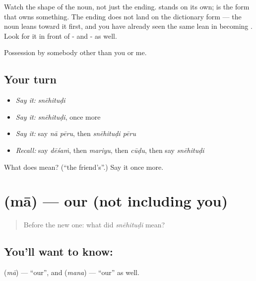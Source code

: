 \begin{grammarlens}[title={Grammar Lens: the noun changes shape before it does a job}]
Watch the shape of the noun, not just the ending.  stands on its own;  is the form that owns something. The ending does not land on the dictionary form — the noun leans toward it first, and you have already seen the same lean in  becoming . Look for it in front of - and - as well.
\end{grammarlens}

\begin{grammarlens}[title={What you've built}]
Possession by somebody other than you or me.
\end{grammarlens}

\subsection*{Your turn}
\begin{itemize}
\raggedright
  \item \emph{Say it:} \emph{snēhituḍi}
  \item \emph{Say it:} \emph{snēhituḍi}, once more
  \item \emph{Say it:} say \emph{nā pēru}, then \emph{snēhituḍi pēru}
  \item \emph{Recall:} say \emph{dēśaṁ}, then \emph{mariyu}, then \emph{cūḍu}, then say \emph{snēhituḍi}
\end{itemize}

\begin{tcolorbox}[breakable,colback=teal!4,colframe=teal!35!black,title={Before you move on}]
What does  mean? (\textquotedblleft{}the friend's\textquotedblright{}.) Say it once more.
\end{tcolorbox}
\section[\texorpdfstring{\te{మా} (mā)}{మా (mā)}]{ (mā) — our (not including you)}

\label{lesson:TE-C79-our}



\begin{quote}
Before the new one: what did \emph{snēhituḍi} mean?
\end{quote}

\subsection*{You'll want to know: }
\textbf{} (\emph{mā}) — \textquotedblleft{}our\textquotedblright{}, and \textbf{} (\emph{mana}) — \textquotedblleft{}our\textquotedblright{} as well.

